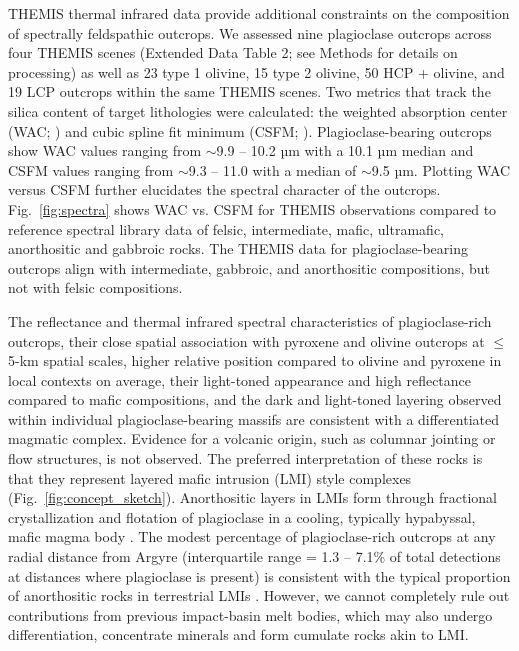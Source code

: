 \documentclass[12pt]{article}
\begin{document}
THEMIS thermal infrared data provide additional constraints on the composition of spectrally feldspathic outcrops. We assessed nine plagioclase outcrops across four THEMIS scenes (Extended Data Table 2; see Methods for details on processing) as well as 23 type 1 olivine, 15 type 2 olivine, 50 HCP + olivine, and 19 LCP outcrops within the same THEMIS scenes. Two metrics that track the silica content of target lithologies were calculated: the weighted absorption center (WAC; \citealt{Smith2013, Amador2016}) and cubic spline fit minimum (CSFM; \citealt{Rogers2015}). Plagioclase-bearing outcrops show WAC values ranging from $\sim$9.9 -- 10.2 µm with a 10.1 µm median and CSFM values ranging from $\sim$9.3 -- 11.0 with a median of $\sim$9.5 µm. Plotting WAC versus CSFM further elucidates the spectral character of the outcrops. Fig.~\ref{fig:spectra} shows WAC vs. CSFM for THEMIS observations compared to reference spectral library data of felsic, intermediate, mafic, ultramafic, anorthositic and gabbroic rocks. The THEMIS data for plagioclase-bearing outcrops align with intermediate, gabbroic, and anorthositic compositions, but not with felsic compositions.

The reflectance and thermal infrared spectral characteristics of plagioclase-rich outcrops, their close spatial association with pyroxene and olivine outcrops at $\leq$5-km spatial scales, higher relative position compared to olivine and pyroxene in local contexts on average, their light-toned appearance and high reflectance compared to mafic compositions, and the dark and light-toned layering observed within individual plagioclase-bearing massifs are consistent with a differentiated magmatic complex. Evidence for a volcanic origin, such as columnar jointing or flow structures, is not observed. The preferred interpretation of these rocks is that they represent layered mafic intrusion (LMI) style complexes (Fig.~\ref{fig:concept_sketch}). Anorthositic layers in LMIs form through fractional crystallization and flotation of plagioclase in a cooling, typically hypabyssal, mafic magma body \citep{Ashwal1993}. The modest percentage of plagioclase-rich outcrops at any radial distance from Argyre (interquartile range = 1.3 -- 7.1\% of total detections at distances where plagioclase is present) is consistent with the typical proportion of anorthositic rocks in terrestrial LMIs \citep{Ashwal1993, Ashwal2021}. However, we cannot completely rule out contributions from previous impact-basin melt bodies, which may also undergo differentiation, concentrate minerals and form cumulate rocks akin to LMI.
\end{document}
